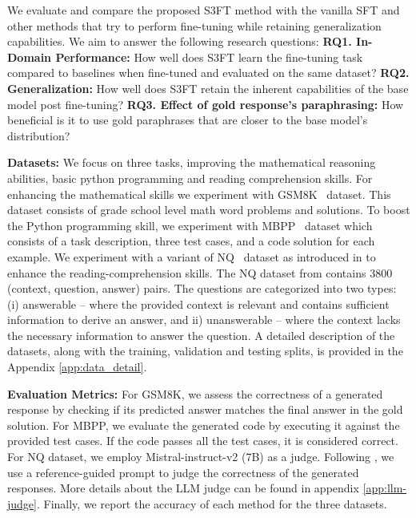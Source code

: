 \noindent We evaluate and compare the proposed S3FT method with the vanilla SFT and other methods that try to perform fine-tuning while retaining generalization capabilities. We aim to answer the following research questions: \textbf{RQ1. In-Domain Performance:} How well does S3FT learn the fine-tuning task compared to baselines when fine-tuned and evaluated on the same dataset? \textbf{RQ2. Generalization:} How well does S3FT retain the inherent capabilities of the base model post fine-tuning? \textbf{RQ3. Effect of gold response's paraphrasing:} How beneficial is it to use gold paraphrases that are closer to the base model's distribution? 

\noindent \textbf{Datasets:} 
We focus on three tasks, improving the mathematical reasoning abilities, basic python programming and reading comprehension skills. For enhancing the mathematical skills we experiment with GSM8K~\cite{cobbe2021training} dataset. This dataset consists of grade school level math word problems and solutions. To boost the Python programming skill, we experiment with MBPP~\cite{austin2021program} dataset which consists of a task description, three test cases, and a code solution for each example. We experiment with a variant of NQ~\cite{kwiatkowski2019natural} dataset as introduced in \cite{slobodkin2023curious} to enhance the reading-comprehension skills. The NQ dataset from \cite{slobodkin2023curious}  contains 3800 (context, question, answer) pairs. The questions are categorized into two types: (i) answerable -- where the provided context is relevant and contains sufficient information to derive an answer, and ii) unanswerable -- where the context lacks the necessary information to answer the question. A detailed description of the datasets, along with the training, validation and testing splits, is provided in the Appendix \ref{app:data_detail}.
\vspace{0.2ex}

\noindent \textbf{Evaluation Metrics:} For GSM8K, we assess the correctness of a generated response by checking if its predicted answer matches the final answer in the gold solution. For MBPP, we evaluate the generated code by executing it against the provided test cases. If the code passes all the test cases, it is considered correct. For NQ dataset, we employ Mistral-instruct-v2 (7B) as a judge. Following \cite{badshah2408reference}, we use a reference-guided prompt to judge the correctness of the generated responses. More details about the LLM judge can be found in appendix \ref{app:llm-judge}. Finally, we report the accuracy of each method for the three datasets.

